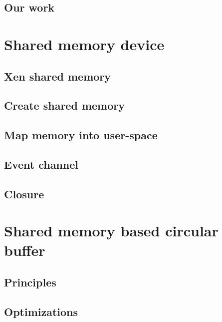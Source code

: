 \documentclass[journal]{IEEEtran}
\begin{document}
\subsection{Our work}



\section{Shared memory device}

\subsection{Xen shared memory}



\subsection{Create shared memory}



\subsection{Map memory into user-space}



\subsection{Event channel}



\subsection{Closure}









\section{Shared memory based circular buffer}

\subsection{Principles}



\subsection{Optimizations}
\end{document}
